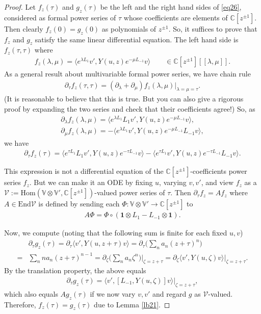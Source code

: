 \documentclass[11pt,b5paper,notitlepage]{article}
\theoremstyle{definition}
\theoremstyle{plain}
\newcommand{\mc}{\mathcal}
\newcommand{\End}{\mathrm{End}} %
\newcommand{\id}{\mathbf{1}}
\newcommand{\Hom}{\mathrm{Hom}}
\newcommand{\bigbk}[1]{\big\langle {#1}\big\rangle}
\newcommand{\Vbb}{\mathbb V}
\newcommand{\Cbb}{\mathbb C}
\numberwithin{equation}{section}
\begin{document}
\begin{proof}
Let $f_z(\tau)$ and $g_z(\tau)$ be the left and the right hand sides of \eqref{eq26}, considered as formal power series of $\tau$ whose coefficients are elements of $\Cbb[z^{\pm 1}]$. Then clearly $f_z(0)=g_z(0)$ as polynomials of $z^{\pm1}$. So, it suffices to prove that $f_z$ and $g_z$ satisfy the same linear differential equation. The left hand side is $f_z(\tau,\tau)$ where
\begin{align*}
f_z(\lambda,\mu)=\bigbk{e^{\lambda L_1}v',Y(u,z)e^{-\mu L_{-1}}v}\qquad\in\Cbb[z^{\pm1}][[\lambda,\mu]].
\end{align*}
As a general result about multivariable formal power series, we have chain rule
\begin{align*}
\partial_\tau f_z(\tau,\tau)=(\partial_\lambda+\partial_\mu)f_z(\lambda,\mu)\big|_{\lambda=\mu=\tau}.	
\end{align*}
(It is reasonable to believe that this is true. But you can also give a rigorous proof by expanding the two series  and check that their coefficients agree!) So, as
\begin{gather*}
\partial_\lambda f_z(\lambda,\mu)=\bigbk{e^{\lambda L_1}L_1v',Y(u,z)e^{-\mu L_{-1}}v},\\
\partial_\mu f_z(\lambda,\mu)=-\bigbk{e^{\lambda L_1}v',Y(u,z)e^{-\mu L_{-1}}L_{-1}v},	
\end{gather*}
we have
\begin{align*}
\partial_\tau f_z(\tau)=\bigbk{e^{\tau L_1}L_1v',Y(u,z)e^{-\tau L_{-1}}v}-\bigbk{e^{\tau L_1}v',Y(u,z)e^{-\tau L_{-1}}L_{-1}v}.
\end{align*}

This expression is not a differential equation of the $\Cbb[z^{\pm1}]$-coefficients power series $f_z$. But we can make it an ODE by fixing $u$, varying $v,v'$, and view $f_z$ as a $\mc V:=\Hom(\Vbb\otimes\Vbb',\Cbb[z^{\pm1}])$-valued power series of $\tau$. Then $\partial_\tau f_z=Af_z$ where $A\in\End\mc V$ is defined by sending each $\Phi:\Vbb\otimes\Vbb'\rightarrow\Cbb[z^{\pm1}]$ to
\begin{align*}
A\Phi=\Phi\circ (\id\otimes L_1-L_{-1}\otimes\id).
\end{align*}


Now, we compute (noting that the following sum is finite for each fixed $u,v$)
\begin{align*}
&\partial_\tau g_z(\tau)=\partial_\tau \bigbk{v',Y(u,z+\tau)v}=\partial_\tau\Big(\sum_n a_n(z+\tau)^n\Big)\\
=& 	\sum_n na_n(z+\tau)^{n-1}=\partial_\zeta\Big(\sum_n a_n\zeta^n\Big)\Big|_{\zeta=z+\tau}=\partial_\zeta \bigbk{v',Y(u,\zeta)v}\big|_{\zeta=z+\tau}.
\end{align*}
By the translation property, the above equals
\begin{align*}
\partial_\tau g_z(\tau)=	\bigbk{v',[L_{-1},Y(u,\zeta)]v}\big|_{\zeta=z+\tau},
\end{align*}
which also equals $Ag_z(\tau)$ if we now vary $v,v'$ and regard $g$ as $\mc V$-valued. Therefore, $f_z(\tau)=g_z(\tau)$ due to Lemma \ref{lb21}.
\end{proof}
\end{document}
